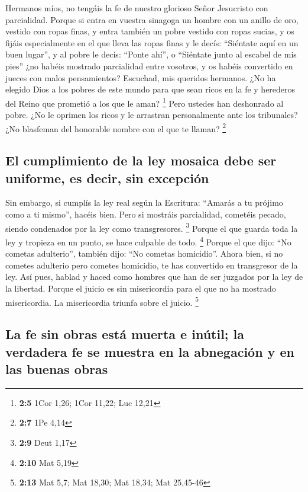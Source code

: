  Hermanos míos, no tengáis la fe de nuestro glorioso Señor
Jesucristo con parcialidad.  Porque si entra en vuestra
sinagoga un hombre con un anillo de oro, vestido con ropas finas, y
entra también un pobre vestido con ropas sucias,  y os
fijáis especialmente en el que lleva las ropas finas y le decís:
``Siéntate aquí en un buen lugar'', y al pobre le decís: ``Ponte ahí'',
o ``Siéntate junto al escabel de mis pies''  ¿no habéis
mostrado parcialidad entre vosotros, y os habéis convertido en jueces
con malos pensamientos?  Escuchad, mis queridos hermanos.
¿No ha elegido Dios a los pobres de este mundo para que sean ricos en la
fe y herederos del Reino que prometió a los que le aman? \footnote{\textbf{2:5}
  1Cor 1,26; 1Cor 11,22; Luc 12,21}  Pero ustedes han
deshonrado al pobre. ¿No le oprimen los ricos y le arrastran
personalmente ante los tribunales?  ¿No blasfeman del
honorable nombre con el que te llaman? \footnote{\textbf{2:7} 1Pe 4,14}

\hypertarget{el-cumplimiento-de-la-ley-mosaica-debe-ser-uniforme-es-decir-sin-excepciuxf3n}{%
\subsection{El cumplimiento de la ley mosaica debe ser uniforme, es
decir, sin
excepción}\label{el-cumplimiento-de-la-ley-mosaica-debe-ser-uniforme-es-decir-sin-excepciuxf3n}}

 Sin embargo, si cumplís la ley real según la Escritura:
``Amarás a tu prójimo como a ti mismo'', hacéis bien. 
Pero si mostráis parcialidad, cometéis pecado, siendo condenados por la
ley como transgresores. \footnote{\textbf{2:9} Deut 1,17}
 Porque el que guarda toda la ley y tropieza en un punto,
se hace culpable de todo. \footnote{\textbf{2:10} Mat 5,19}
 Porque el que dijo: ``No cometas adulterio'', también
dijo: ``No cometas homicidio''. Ahora bien, si no cometes adulterio pero
cometes homicidio, te has convertido en transgresor de la ley.
 Así pues, hablad y haced como hombres que han de ser
juzgados por la ley de la libertad.  Porque el juicio es
sin misericordia para el que no ha mostrado misericordia. La
misericordia triunfa sobre el juicio. \footnote{\textbf{2:13} Mat 5,7;
  Mat 18,30; Mat 18,34; Mat 25,45-46}

\hypertarget{la-fe-sin-obras-estuxe1-muerta-e-inuxfatil-la-verdadera-fe-se-muestra-en-la-abnegaciuxf3n-y-en-las-buenas-obras}{%
\subsection{La fe sin obras está muerta e inútil; la verdadera fe se
muestra en la abnegación y en las buenas
obras}\label{la-fe-sin-obras-estuxe1-muerta-e-inuxfatil-la-verdadera-fe-se-muestra-en-la-abnegaciuxf3n-y-en-las-buenas-obras}}

